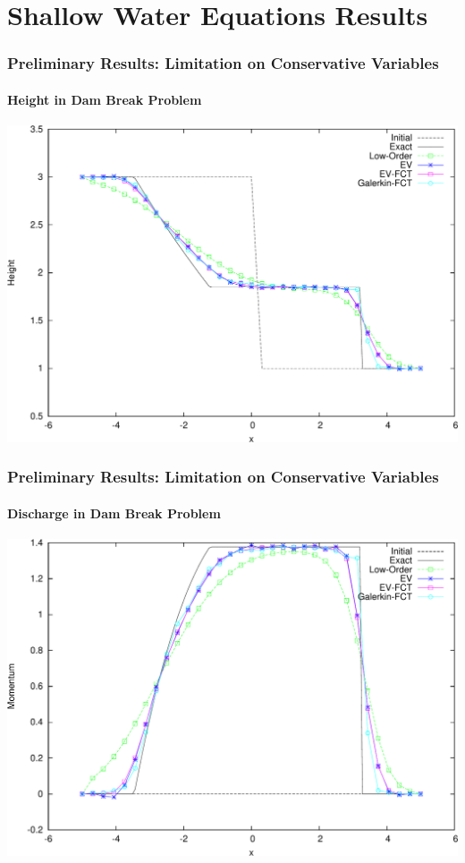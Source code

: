 \documentclass{beamer} \useoutertheme{infolines}
\begin{document}
\section{Shallow Water Equations Results}
\begin{frame}
\frametitle{Preliminary Results: Limitation on Conservative Variables}
\framesubtitle{Height in Dam Break Problem}

\begin{center}
\includegraphics[height=0.8\textheight]{./figures/height_FE.pdf}
\end{center}

\end{frame}
\begin{frame}
\frametitle{Preliminary Results: Limitation on Conservative Variables}
\framesubtitle{Discharge in Dam Break Problem}

\begin{center}
\includegraphics[height=0.8\textheight]{./figures/momentum_FE.pdf}
\end{center}

\end{frame}
\end{document}
